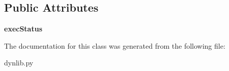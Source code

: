 \subsection*{Public Attributes}
\begin{DoxyCompactItemize}
\item 
\mbox{\label{classdlg_1_1apps_1_1dynlib_1_1_dynlib_stream_app_a1d3680bbec1f9614c2846b9f06c84a1f}} 
{\bfseries exec\+Status}
\end{DoxyCompactItemize}


The documentation for this class was generated from the following file\+:\begin{DoxyCompactItemize}
\item 
dynlib.\+py\end{DoxyCompactItemize}

